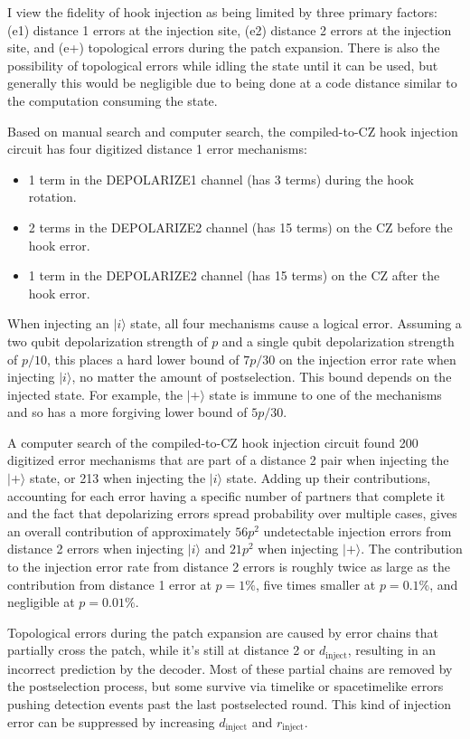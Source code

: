 \documentclass[onecolumn,unpublished,a4paper]{quantumarticle}
\theoremstyle{definition}
\theoremstyle{definition}
\theoremstyle{definition}
\begin{document}
I view the fidelity of hook injection as being limited by three primary factors: (e1) distance 1 errors at the injection site, (e2) distance 2 errors at the injection site, and (e+) topological errors during the patch expansion.
There is also the possibility of topological errors while idling the state until it can be used, but generally this would be negligible due to being done at a code distance similar to the computation consuming the state.

Based on manual search and computer search, the compiled-to-CZ hook injection circuit has four digitized distance 1 error mechanisms:

\begin{itemize}
    \item 1 term in the DEPOLARIZE1 channel (has 3 terms) during the hook rotation.
    \item 2 terms in the DEPOLARIZE2 channel (has 15 terms) on the CZ before the hook error.
    \item 1 term in the DEPOLARIZE2 channel (has 15 terms) on the CZ after the hook error.
\end{itemize}

When injecting an $|i\rangle$ state, all four mechanisms cause a logical error.
Assuming a two qubit depolarization strength of $p$ and a single qubit depolarization strength of $p/10$, this places a hard lower bound of $7p/30$ on the injection error rate when injecting $|i\rangle$, no matter the amount of postselection.
This bound depends on the injected state.
For example, the $|+\rangle$ state is immune to one of the mechanisms and so has a more forgiving lower bound of $5p/30$.

A computer search of the compiled-to-CZ hook injection circuit found 200 digitized error mechanisms that are part of a distance 2 pair when injecting the $|+\rangle$ state, or 213 when injecting the $|i\rangle$ state.
Adding up their contributions, accounting for each error having a specific number of partners that complete it and the fact that depolarizing errors spread probability over multiple cases, gives an overall contribution of approximately $56p^2$ undetectable injection errors from distance 2 errors when injecting $|i\rangle$ and $21p^2$ when injecting $|+\rangle$.
The contribution to the injection error rate from distance 2 errors is roughly twice as large as the contribution from distance 1 error at $p=1\%$, five times smaller at $p=0.1\%$, and negligible at $p=0.01\%$.

Topological errors during the patch expansion are caused by error chains that partially cross the patch, while it's still at distance 2 or $d_\text{inject}$, resulting in an incorrect prediction by the decoder.
Most of these partial chains are removed by the postselection process, but some survive via timelike or spacetimelike errors pushing detection events past the last postselected round.
This kind of injection error can be suppressed by increasing $d_\text{inject}$ and $r_\text{inject}$.
\end{document}
